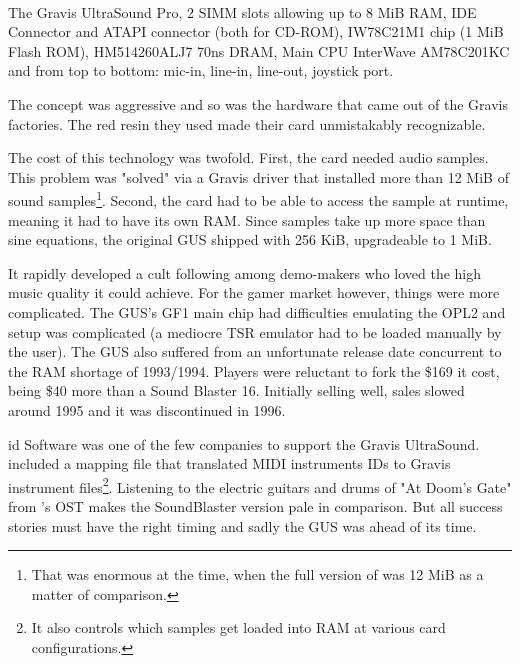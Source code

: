 \\
\par
The Gravis UltraSound Pro,  2 SIMM slots allowing up to 8 MiB RAM,  IDE Connector and  ATAPI connector (both for CD-ROM),  IW78C21M1 chip (1 MiB Flash ROM),  HM514260ALJ7 70ns DRAM,  Main CPU InterWave AM78C201KC and  from top to bottom: mic-in, line-in, line-out, joystick port.\\

The concept was aggressive and so was the hardware that came out of the Gravis factories. The red resin they used made their card unmistakably recognizable.\\
\par
The cost of this technology was twofold. First, the card needed audio samples. This problem was "solved" via a Gravis driver that installed more than 12 MiB of sound samples\footnote{That was enormous at the time, when the full version of \doom{} was 12 MiB as a matter of comparison.}. Second, the card had to be able to access the sample at runtime, meaning it had to have its own RAM. Since samples take up more space than sine equations, the original GUS shipped with 256 KiB, upgradeable to 1 MiB.\\
\par
It rapidly developed a cult following among demo-makers who loved the high music quality it could achieve. For the gamer market however, things were more complicated. The GUS's GF1 main chip had difficulties emulating the OPL2 and setup was complicated (a mediocre TSR emulator had to be loaded manually by the user). The GUS also suffered from an unfortunate release date concurrent to the RAM shortage of 1993/1994. Players were reluctant to fork the \$169 it cost, being \$40 more than a Sound Blaster 16. Initially selling well, sales slowed around 1995 and it was discontinued in 1996.\\
\par
 id Software was one of the few companies to support the Gravis UltraSound. \doom{} included a mapping file that translated MIDI instruments IDs to Gravis  instrument files\footnote{It also controls which samples get loaded into RAM at various card configurations.}. Listening to the electric guitars and drums of "At Doom's Gate" from \doom{}'s OST makes the SoundBlaster version pale in comparison. But all success stories must have the right timing and sadly the GUS was ahead of its time.\vspace{-5pt}

